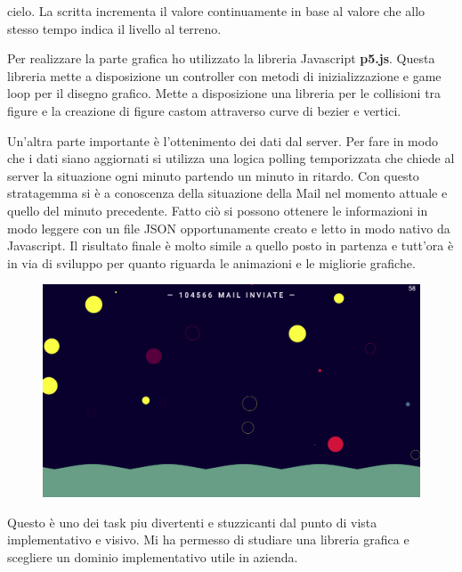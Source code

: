 \documentclass[a4paper]{article}
\begin{document}
cielo. La scritta incrementa il valore continuamente in base al valore che allo stesso tempo
indica il livello al terreno.
\par Per realizzare la parte grafica ho utilizzato la libreria Javascript \textbf{p5.js}.
Questa libreria mette a disposizione un controller con metodi di inizializzazione e game loop
per il disegno grafico. Mette a disposizione una libreria per le collisioni tra figure e la creazione
di figure castom attraverso curve di bezier e vertici.
\par Un'altra parte importante è l'ottenimento dei dati dal server. Per fare in modo che i dati
siano aggiornati si utilizza una logica polling temporizzata che chiede al server la situazione
ogni minuto partendo un minuto in ritardo. Con questo stratagemma si è a conoscenza della situazione della Mail
nel momento attuale e quello del minuto precedente. Fatto ciò si possono ottenere le informazioni
in modo leggere con un file JSON opportunamente creato e letto in modo nativo da Javascript.
Il risultato finale è molto simile a quello posto in partenza e tutt'ora è in via di sviluppo per 
quanto riguarda le animazioni e le migliorie grafiche.
\begin{figure}[H]
	\includegraphics[width=\textwidth]{delivery-final.png}
	\centering
\end{figure}
\par Questo è uno dei task piu divertenti e stuzzicanti dal punto di vista implementativo e
visivo. Mi ha permesso di studiare una libreria grafica e scegliere un dominio implementativo 
utile in azienda.
\end{document}
